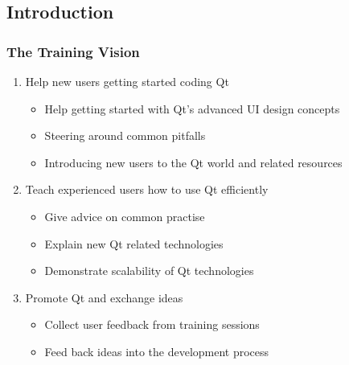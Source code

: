 %
%
%
%

\subsection{Introduction}

\begin{slide}
  \frametitle{The Training Vision}
  \begin{enumerate}
    \item Help new users getting started coding Qt
    \begin{itemize}
      \item Help getting started with Qt's advanced UI design concepts
      \item Steering around common pitfalls
      \item Introducing new users to the Qt world and related resources
    \end{itemize}
    \item Teach experienced users how to use Qt efficiently
    \begin{itemize}
      \item Give advice on common practise
      \item Explain new Qt related technologies
      \item Demonstrate scalability of Qt technologies
    \end{itemize}
    \item Promote Qt and exchange ideas
    \begin{itemize}
      \item Collect user feedback from training sessions
      \item Feed back ideas into the development process
    \end{itemize}
  \end{enumerate}
\end{slide}

